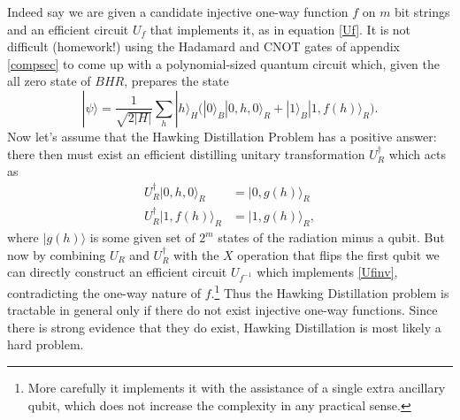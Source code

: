 \documentclass[12pt]{article}
\newcommand{\be}{\begin{equation}}
\newcommand{\ee}{\end{equation}}
\newcommand{\ran}{\rangle}
\begin{document}
Indeed say we are given a candidate injective one-way function $f$ on $m$ bit strings and an efficient circuit $U_f$ that implements it, as in equation \eqref{Uf}.   It is not difficult (homework!) using the Hadamard and CNOT gates of appendix \ref{compsec} to come up with a polynomial-sized quantum circuit which, given the all zero state of $BHR$, prepares the state
\be\label{psiscott}
|\psi\ran=\frac{1}{\sqrt{2|H|}}\sum_h|h\ran_H\Big(|0\ran_B|0,h,0\ran_R+|1\ran_B|1,f(h)\ran_R\Big).
\ee
Now let's assume that the Hawking Distillation Problem has a positive answer: there then must exist an efficient distilling unitary transformation $U_R^\dagger$ which acts as
\begin{align}
U_R^\dagger |0,h,0\ran_R&=|0,g(h)\ran_R\\
U_R^\dagger |1,f(h)\ran_R&=|1,g(h)\ran_R,
\end{align}
where $|g(h)\ran$ is some given set of $2^m$ states of the radiation minus a qubit.
But now by combining $U_R$ and $U_R^\dagger$ with the $X$ operation that flips the first qubit we can directly construct an efficient circuit $U_{f^{-1}}$ which implements \eqref{Ufinv}, contradicting the one-way nature of $f$.\footnote{More carefully it implements it with the assistance of a single extra ancillary qubit, which does not increase the complexity in any practical sense.}  Thus the Hawking Distillation problem is tractable in general only if there do not exist injective one-way functions.  Since there is strong evidence that they do exist, Hawking Distillation is most likely a hard problem.
\end{document}
